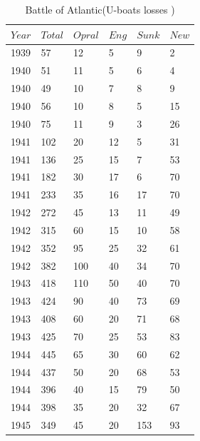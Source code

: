 \documentclass[]{article}
\begin{document}
\begin{table}


\tiny
\caption{Battle of Atlantic(U-boats losses \cite{hughes1977battle})\\}
\vspace{0.5cm}
\tiny

{\begin{tabular}{|p{.5cm}|p{.5cm}|p{.5cm}|p{.5cm}|p{.5cm}|p{.5cm}|} 
\hline
\centering

$Year$ & $Total$ & $Opral$	& $Eng$	& $Sunk$ & $New$ \\
\hline  
1939&	57&	12&	5&	9&	2\\
1940&	51&	11&	5&	6&	4\\
1940&	49&	10&	7&	8&	9\\
1940&	56&	10&	8&	5&	15\\
1940&	75&	11&	9&	3&	26\\
1941&	102&	20&	12&	5&	31\\
1941&	136&	25&	15&	7&	53\\
1941&	182&	30&	17&	6&	70\\
1941&	233&	35&	16&	17&	70\\
1942&	272&	45&	13&	11&	49\\
1942&	315&	60&	15&	10&	58\\
1942&	352&	95&	25&	32&	61\\
1942&	382&	100&	40&	34&	70\\
1943&	418&	110&	50&	40&	70\\
1943&	424&	90&	40&	73&	69\\
1943&	408&	60&	20&	71&	68\\
1943&	425&	70&	25&	53&	83\\
1944&	445&	65&	30&	60&	62\\
1944&	437&	50&	20&	68&	53\\
1944&	396&	40&	15&	79&	50\\
1944&	398&	35&	20&	32&	67\\
1945&	349&	45&	20&	153&	93\\

\hline

\end{tabular}}%
\tiny
\end{table}
\end{document}
